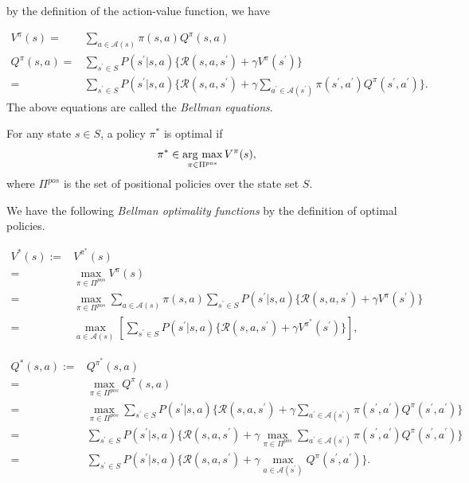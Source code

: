 by the definition of the action-value function, we have

\begin{align}
  V^{\pi}(s) = & \sum_{a \in \mathcal{A}(s)} \pi(s,a) Q^{\pi}(s,a) \nonumber \\
  Q^{\pi}(s,a) = & \sum_{s^{\prime} \in S} P(s^{\prime}|s,a) \{ \mathcal{R}(s, a, s^{\prime}) + \gamma V^{\pi}(s^{\prime}) \} \nonumber \\
               = & \sum_{s^{\prime} \in S} P(s^{\prime}|s,a) \{ \mathcal{R}(s, a, s^{\prime}) + \gamma \sum_{a^{\prime} \in \mathcal{A}(s^{\prime})} \pi(s^{\prime}, a^{\prime}) Q^{\pi}(s^{\prime},a^{\prime}) \}.
 \label{Q_pi}
\end{align}
 The above equations are called the {\it Bellman equations}.

\begin{definition}
  For any state $s \in S$, a policy $\pi^{\ast}$ is optimal if
  \begin{align*}
    \pi^{\ast} \in \mathop{\rm arg~max}\limits_{\pi \in \Pi^{pos}} V^{\pi}(s),
  \end{align*}
where $\Pi^{pos}$ is the set of positional policies over the state set $S$.

We have the following {\it Bellman optimality functions} by the definition of optimal policies.

\begin{align}
  V^{\ast}(s) := & V^{\pi^{\ast}}(s) \nonumber \\
               = & \max_{\pi \in \Pi^{pos}} V^{\pi}(s) \nonumber \\
                    = & \max_{\pi \in \Pi^{pos}} \sum_{a \in \mathcal{A}(s)} \pi(s,a) \sum_{s^{\prime} \in S} P(s^{\prime}|s,a) \{ \mathcal{R}(s, a, s^{\prime}) + \gamma V^{\pi}(s^{\prime}) \} \nonumber \\
                    = & \max_{a \in \mathcal{A}(s)} [ \sum_{s^{\prime} \in S} P(s^{\prime}|s,a) \{ \mathcal{R}(s, a, s^{\prime}) + \gamma V^{\pi^{\ast}}(s^{\prime}) \} ],
\label{opt_V}
\end{align}

\begin{align}
  Q^{\ast}(s,a) := & Q^{\pi^{\ast}}(s,a) \nonumber \\
                = & \max_{\pi \in \Pi^{pos}} Q^{\pi}(s,a) \nonumber \\
                      = & \max_{\pi \in \Pi^{pos}} \sum_{s^{\prime} \in S} P(s^{\prime}|s,a) \{ \mathcal{R}(s, a, s^{\prime}) + \gamma \sum_{a^{\prime} \in \mathcal{A}(s^{\prime})} \pi(s^{\prime}, a^{\prime}) Q^{\pi}(s^{\prime},a^{\prime}) \} \nonumber \\
                      = & \sum_{s^{\prime} \in S} P(s^{\prime}|s,a) \{ \mathcal{R}(s, a, s^{\prime}) + \gamma \max_{\pi \in \Pi^{pos}} \sum_{a^{\prime} \in \mathcal{A}(s^{\prime})} \pi(s^{\prime}, a^{\prime}) Q^{\pi}(s^{\prime},a^{\prime}) \} \nonumber \\
                      = & \sum_{s^{\prime} \in S} P(s^{\prime}|s,a) \{ \mathcal{R}(s, a, s^{\prime}) + \gamma \max_{a \in \mathcal{A}(s^{\prime})} Q^{\pi}(s^{\prime},a^{\prime}) \}.
\label{opt_Q}
\end{align}
\label{opt_pol}
\end{definition}


